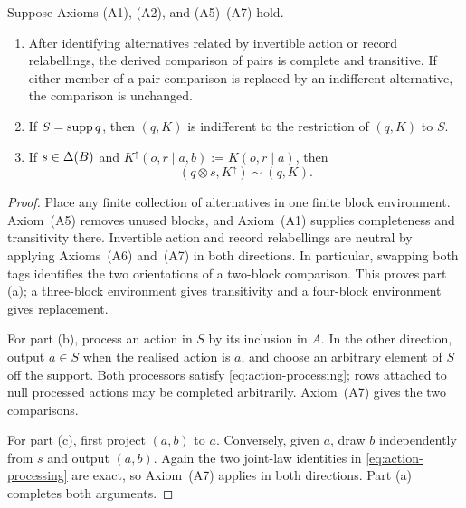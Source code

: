 \begin{lemma}\label{lf:lem:bookkeeping}
Suppose Axioms \textup{(A1)}, \textup{(A2)}, and
\textup{(A5)--(A7)} hold.
\begin{enumerate}[label=\textup{(\alph*)},leftmargin=*]
\item After identifying alternatives related by invertible action or record
  relabellings, the derived comparison of pairs is complete and transitive.
  If either member of a pair comparison is replaced by an indifferent
  alternative, the comparison is unchanged.
\item If $S=\operatorname{supp} q$, then $(q,K)$ is indifferent to the restriction of
  $(q,K)$ to $S$.
\item If $s\in\Delta(B)$ and $K^\uparrow(o,r\mid a,b):=K(o,r\mid a)$, then
  \begin{equation}
  (q\otimes s,K^\uparrow)\sim(q,K).
  \label{lf:eq:dummy-ordinal}
  \end{equation}
\end{enumerate}
\end{lemma}

\begin{proof}
Place any finite collection of alternatives in one finite block environment.
Axiom~\textup{(A5)} removes unused blocks, and Axiom~\textup{(A1)} supplies
completeness and transitivity there.  Invertible action and record relabellings
are neutral by applying Axioms~\textup{(A6)} and~\textup{(A7)} in both
directions.  In particular, swapping both tags identifies the two orientations
of a two-block comparison.  This proves part \textup{(a)}; a three-block
environment gives transitivity and a four-block environment gives replacement.

For part \textup{(b)}, process an action in $S$ by its inclusion in $A$.  In the
other direction, output $a\in S$ when the realised action is $a$, and choose an
arbitrary element of $S$ off the support.  Both processors satisfy
\eqref{eq:action-processing}; rows attached to null processed actions may be
completed arbitrarily.  Axiom~\textup{(A7)} gives the two comparisons.

For part \textup{(c)}, first project $(a,b)$ to $a$.  Conversely, given $a$,
draw $b$ independently from $s$ and output $(a,b)$.  Again the two joint-law
identities in \eqref{eq:action-processing} are exact, so Axiom~\textup{(A7)}
applies in both directions.  Part \textup{(a)} completes both arguments.
\end{proof}

